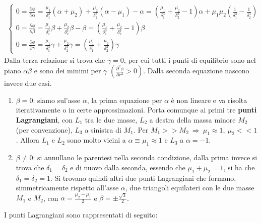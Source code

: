 \documentclass[a4paper, oneside]{book}
\begin{document}
\begin{gather*}
    \left\{\begin{array}{l}
        \displaystyle 0 = \frac{\partial \phi}{\partial \alpha} = \frac{\mu_1}{\delta_1^{3}} (\alpha + \mu_2) + \frac{\mu_2}{\delta_2^{3}} (\alpha - \mu_1) - \alpha = \left(\frac{\mu_1}{\delta_1^{3}} + \frac{\mu_2}{\delta_2^{3}} - 1\right)  \alpha + \mu_1 \mu_2 \left(\frac{1}{\delta_1^{3}} - \frac{1}{\delta_2^{3}}\right) \\
        \displaystyle 0 = \frac{\partial \phi}{\partial \beta} = \frac{\mu_1}{\delta_1^{3}}\beta + \frac{\mu_2}{\delta_2^{3}} \beta - \beta = \left(\frac{\mu_1}{\delta_1^{3}} + \frac{\mu_2}{\delta_2^{3}} - 1\right)\beta \\
        \displaystyle 0 = \frac{\partial \phi}{\partial \gamma} = \frac{\mu_1}{\delta_1^{3}} \gamma + \frac{\mu_2}{\delta_2^{3}}\gamma = \left(\frac{\mu_1}{\delta_1^{3}} + \frac{\mu_2}{\delta_2^{3}}\right)  \gamma
    \end{array}\right.
\end{gather*}
Dalla terza relazione si trova che $\gamma = 0$, per cui tutti i punti di equilibrio sono nel piano 
$\alpha\beta$ e sono dei minimi per $\gamma$ $\left(\frac{\partial^{2}\phi}{\partial r^{2}} > 0 \right)$.
Dalla seconda equazione nascono invece due casi. 
\begin{enumerate}
    \item $\beta = 0$: siamo sul'asse $\alpha$, la prima equazione per $\alpha$ 
    è non lineare e va risolta iterativamente o in certe approssimazioni. Porta 
    comunque ai primi tre \textbf{punti Lagrangiani}, con $L_1$ tra le due masse, 
    $L_2$ a destra della massa minore $M_2$ (per convenzione), 
    $L_3$ a sinistra di $M_1$. Per $M_1 >> M_2 \ \Longrightarrow \ \mu_1 \approx 1, \ \mu_2 << 1$. 
    Allora $L_1$ e $L_2$ sono molto vicini a $\alpha \equiv \mu_1 \approx 1$ e $L_3$ a $\alpha = -1$. 
    \item $\beta \neq 0$: si annullano le parentesi nella seconda condizione, dalla prima 
    invece si trova che $\delta_1 = \delta_2$ e di nuovo dalla seconda, essendo che $\mu_1 + \mu_2 = 1$, 
    si ha che $\delta_1 = \delta_2 = 1$. Si trovano quindi altri due punti Lagrangiani 
    che formano, simmetricamente rispetto all'asse $\alpha$, due triangoli equilateri con le due
    masse $M_1$ e $M_2$, con $\alpha = \frac{\mu_2  - \mu_1}{2}$ e $\beta = \pm \frac{\sqrt{3} }{2}$.
\end{enumerate}
I punti Lagrangiani sono rappresentati di seguito:
\end{document}
